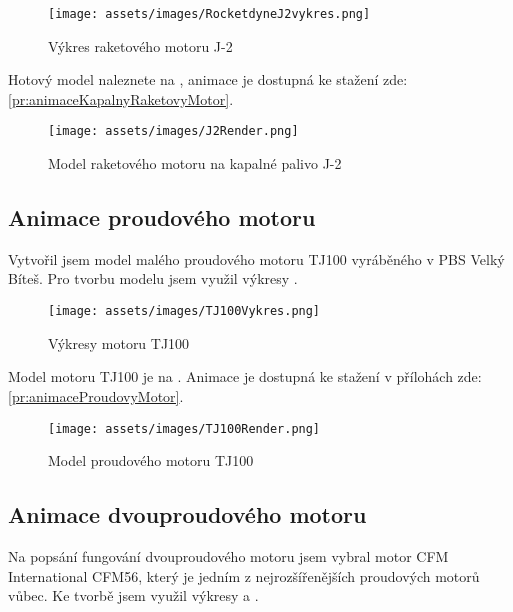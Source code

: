 \begin{figure}[H]
    \centering
    \texttt{[image: assets/images/RocketdyneJ2vykres.png]}
    \caption{Výkres raketového motoru J-2}
    \label{obr:J2vykres}
\end{figure}

{Hotový model naleznete na , animace je dostupná ke stažení zde: \ref{pr:animaceKapalnyRaketovyMotor}.}

\begin{figure}[H]
    \centering
    \texttt{[image: assets/images/J2Render.png]}
    \caption{Model raketového motoru na kapalné palivo J-2 \jaObr}
    \label{obr:J2Render}
\end{figure}

\newpage

\subsection{Animace proudového motoru}
{Vytvořil jsem model malého proudového motoru TJ100 vyráběného v PBS Velký Bíteš. Pro tvorbu modelu jsem využil výkresy .}
\cite{PBS:Minijets}

\begin{figure}[H]
    \centering
    \texttt{[image: assets/images/TJ100Vykres.png]}
    \caption{Výkresy motoru TJ100}
    \label{obr:PBSTJ100Vykres}
\end{figure}

{Model motoru TJ100 je na . Animace je dostupná ke stažení v přílohách zde: \ref{pr:animaceProudovyMotor}.}

\begin{figure}[H]
    \centering
    \texttt{[image: assets/images/TJ100Render.png]}
    \caption{Model proudového motoru TJ100 \jaObr}
    \label{obr:TJ100Render}
\end{figure}

\newpage

\subsection{Animace dvouproudového motoru}
{Na popsání fungování dvouproudového motoru jsem vybral motor CFM International CFM56, který je jedním z nejrozšířenějších proudových motorů vůbec. Ke tvorbě jsem využil výkresy  a .}
\cite{RG:ReducedOrderModel}\cite{TL:OffDesignPerformancePrediction}

